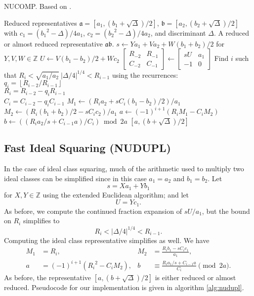 \documentclass{ucalgthes1}
\theoremstyle{definition}
\newcommand{\ZZ}{\mathbb{Z}}
\newcommand{\matrixtt}[4]{\left[ \begin{array}{rr} #1 & #2 \\ #3 & #4 \end{array} \right]}
\newcommand{\floor}[1]{\left\lfloor #1 \right\rfloor}
\begin{document}
\begin{algorithm}[h]
\caption{NUCOMP. Based on \cite[pp.441-443]{Jacobson2009}.}
\label{alg:nucomp}
\begin{algorithmic}[1]
\REQUIRE Reduced representatives $\mathfrak a = [a_1, (b_1+\sqrt\Delta)/2]$, $\mathfrak b = [a_2, (b_2+\sqrt\Delta)/2]$ with \break $c_1 = ({b_1}^2-\Delta)/4a_1$, $c_2 = ({b_2}^2-\Delta)/4a_2$, and discriminant $\Delta$.
\ENSURE A reduced or almost reduced representative $\mathfrak a \mathfrak b$.
\STATE $s \gets Ya_1 + Va_2 + W (b_1+b_2)/2$ for $Y, V, W \in \ZZ$
\STATE $U \gets V(b_1-b_2)/2 + Wc_2$
\STATE $\matrixtt{R_{-2}}{R_{-1}}{C_{-2}}{C_{-1}} \gets \matrixtt{sU}{a_1}{-1}{0}$
\STATE Find $i$ such that $R_i < \sqrt{a_1/a_2} ~ |\Delta/4|^{1/4} < R_{i-1}$ using the recurrences: \\
$q_i = \floor{R_{i-2}/R_{i-1}}$ \\
$R_i = R_{i-2}-q_i R_{i-1}$ \\
$C_i=C_{i-2}-q_i C_{i-1}$
\STATE $M_1 \gets (R_i a_2 + sC_i(b_1-b_2)/2)/a_1$
\STATE $M_2 \gets (R_i (b_1+b_2)/2 -sC_i c_2)/a_1$
\STATE $a \gets (-1)^{i+1}(R_i M_1 - C_i M_2)$
\STATE $b \gets ((R_i a_2/s + C_{i-1} a)/C_i) \bmod{2a}$
\RETURN $[a, (b+\sqrt\Delta)/2]$
\end{algorithmic}
\end{algorithm}


\subsection{Fast Ideal Squaring (NUDUPL)}\label{subsec:nudupl}

In the case of ideal class squaring, much of the arithmetic used to multiply two ideal classes can be simplified since in this case $a_1=a_2$ and $b_1=b_2$.  Let 
\[
	s = Xa_1 + Yb_1
\]
for $X,Y \in \ZZ$ using the extended Euclidean algorithm; and let 
\[
	U = Yc_1.
\]
As before, we compute the continued fraction expansion of $sU/a_1$, but the bound on $R_i$ simplifies to
\[
	R_i < |\Delta/4|^{1/4} < R_{i-1}.
\]
Computing the ideal class representative simplifies as well.  We have
\begin{align*}
	M_1 &= R_i, & 
	M_2 &= \frac{R_i b_1 - sC_i c_1}{a_1}, \\
	a &= (-1)^{i+1}({R_i}^2 - C_i M_2), &
	b &\equiv \frac{R_i a_1/s  + C_{i-1} a}{C_i} \pmod{2a}.
\end{align*}
As before, the representative $[a, (b+\sqrt\Delta)/2]$ is either reduced or almost reduced.  \break Pseudocode for our implementation is given in algorithm \ref{alg:nudupl}.
\end{document}
